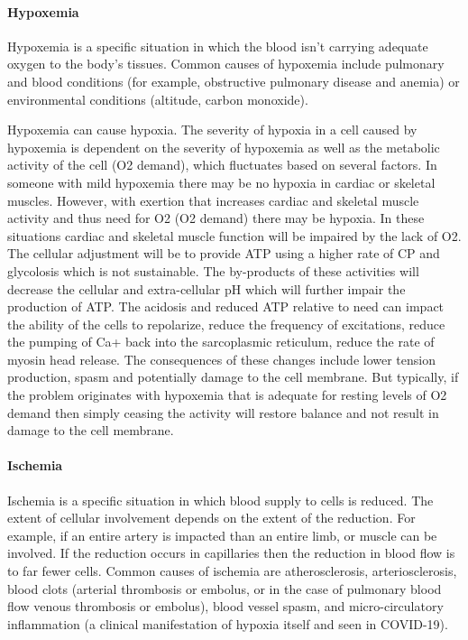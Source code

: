 \paragraph{Hypoxemia}
Hypoxemia is a specific situation in which the blood isn't carrying adequate oxygen to the body’s tissues. Common causes of hypoxemia include pulmonary and blood conditions (for example, obstructive pulmonary disease and anemia) or environmental conditions (altitude, carbon monoxide). 

Hypoxemia can cause hypoxia. The severity of hypoxia in a cell caused by hypoxemia is dependent on the severity of hypoxemia as well as the metabolic activity of the cell (O2 demand), which fluctuates based on several factors. In someone with mild hypoxemia there may be no hypoxia in cardiac or skeletal muscles. However, with exertion that increases cardiac and skeletal muscle activity and thus need for O2 (O2 demand) there may be hypoxia. In these situations cardiac and skeletal muscle function will be impaired by the lack of O2. The cellular adjustment will be to provide ATP using a higher rate of CP and glycolosis which is not sustainable. The by-products of these activities will decrease the cellular and extra-cellular pH which will further impair the production of ATP. The acidosis and reduced ATP relative to need can impact the ability of the cells to repolarize, reduce the frequency of excitations, reduce the pumping of Ca+ back into the sarcoplasmic reticulum, reduce the rate of myosin head release. The consequences of these changes include lower tension production, spasm and potentially damage to the cell membrane. But typically, if the problem originates with hypoxemia that is adequate for resting levels of O2 demand then simply ceasing the activity will restore balance and not result in damage to the cell membrane.
 
\paragraph{Ischemia}
Ischemia is a specific situation in which  blood supply to cells is reduced. The extent of cellular involvement depends on the extent of the reduction. For example, if an entire artery is impacted than an entire limb, or muscle can be involved. If the reduction occurs in capillaries then the reduction in blood flow is to far fewer cells. Common causes of ischemia are atherosclerosis, arteriosclerosis,\footnotemark{} blood clots (arterial thrombosis or embolus, or in the case of pulmonary blood flow venous thrombosis or embolus), blood vessel spasm, and micro-circulatory inflammation (a clinical manifestation of hypoxia itself and seen in COVID-19). 

